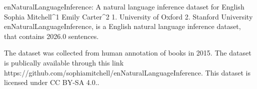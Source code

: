 
enNaturalLanguageInference: A natural language inference dataset for English
Sophia Mitchell^1 Emily Carter^2
1. University of Oxford 2. Stanford University
enNaturalLanguageInference, is a English natural language inference dataset, that contains 2026.0 sentences.

The dataset was collected from human annotation of books in 2015. 
The dataset is publically available through this link https://github.com/sophiamitchell/enNaturalLanguageInference. This dataset is licensed under CC BY-SA 4.0..

